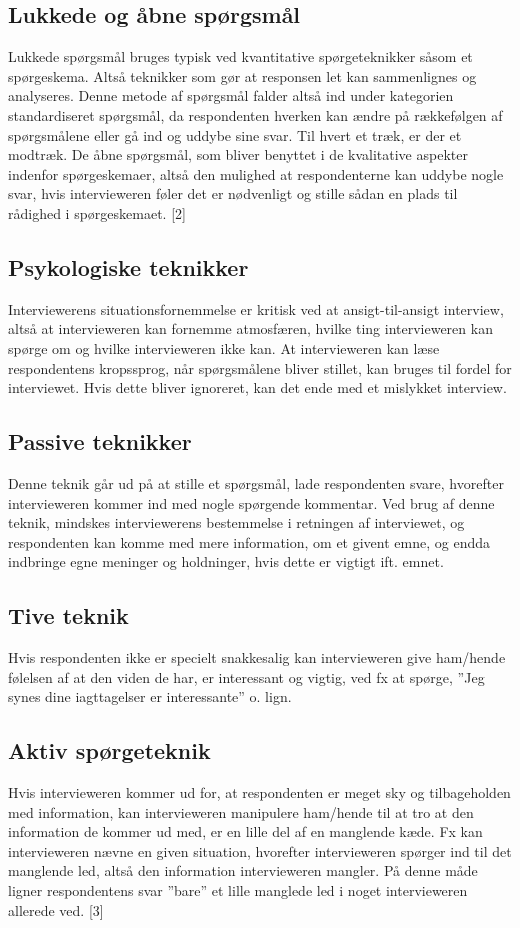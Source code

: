 \subsection{Lukkede og åbne spørgsmål}
Lukkede spørgsmål bruges typisk ved kvantitative spørgeteknikker såsom et spørgeskema. Altså teknikker som gør at responsen let kan sammenlignes og analyseres. Denne metode af spørgsmål falder altså ind under kategorien standardiseret spørgsmål, da respondenten hverken kan ændre på rækkefølgen af spørgsmålene eller gå ind og uddybe sine svar. 
Til hvert et træk, er der et modtræk. De åbne spørgsmål, som bliver benyttet i de kvalitative aspekter indenfor spørgeskemaer, altså den mulighed at respondenterne kan uddybe nogle svar, hvis intervieweren føler det er nødvenligt og stille sådan en plads til rådighed i spørgeskemaet. [2]

\subsection{Psykologiske teknikker}
Interviewerens situationsfornemmelse er kritisk ved at ansigt-til-ansigt interview, altså at intervieweren kan fornemme atmosfæren, hvilke ting intervieweren kan spørge om og hvilke intervieweren ikke kan. At intervieweren kan læse respondentens kropssprog, når spørgsmålene bliver stillet, kan bruges til fordel for interviewet. Hvis dette bliver ignoreret, kan det ende med et mislykket interview.

\subsection{Passive teknikker}
Denne teknik går ud på at stille et spørgsmål, lade respondenten svare, hvorefter intervieweren kommer ind med nogle spørgende kommentar. Ved brug af denne teknik, mindskes interviewerens bestemmelse i retningen af interviewet, og respondenten kan komme med mere information, om et givent emne, og endda indbringe egne meninger og holdninger, hvis dette er vigtigt ift. emnet.

\subsection{Tive teknik}
Hvis respondenten ikke er specielt snakkesalig kan intervieweren give ham/hende følelsen af at den viden de har, er interessant og vigtig, ved fx at spørge, ”Jeg synes dine iagttagelser er interessante” o. lign.

\subsection{Aktiv spørgeteknik}
Hvis intervieweren kommer ud for, at respondenten er meget sky og tilbageholden med information, kan intervieweren manipulere ham/hende til at tro at den information de kommer ud med, er en lille del af en manglende kæde. Fx kan intervieweren nævne en given situation, hvorefter intervieweren spørger ind til det manglende led, altså den information intervieweren mangler. På denne måde ligner respondentens svar ”bare” et lille manglede led i noget intervieweren allerede ved. [3]



